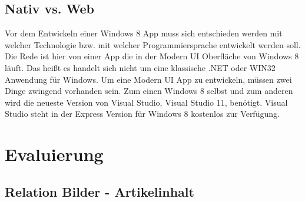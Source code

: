 \documentclass[12pt,a4paper]{scrartcl}
\begin{document}
\subsection{Nativ vs. Web}
\label{nativ_vs_web}
Vor dem Entwickeln einer Windows 8 App muss sich entschieden werden mit welcher Technologie bzw. mit welcher Programmiersprache entwickelt werden soll. Die Rede ist hier von einer App die in der Modern UI Oberfläche von Windows 8 läuft. Das heißt es handelt sich nicht um eine klassische .NET oder WIN32 Anwendung für Windows. Um eine Modern UI App zu entwickeln, müssen zwei Dinge zwingend vorhanden sein. Zum einen Windows 8 selbst und zum anderen wird die neueste Version von Visual Studio, Visual Studio 11, benötigt. Visual Studio steht in der Express Version für Windows 8 kostenlos zur Verfügung.

\newpage
\section{Evaluierung}  
\label{sec:evaluierung}
\subsection{Relation Bilder - Artikelinhalt}
\label{subsec:rel_bilder_artikel} 

\newpage
\begin{singlespace}
\end{singlespace}
\end{document}
